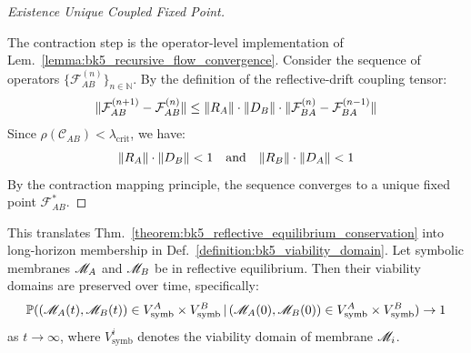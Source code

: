 \begin{proof}[Existence Unique Coupled Fixed Point]
\label{proof:bk5_existence_unique_coupled_fixed_point}
\leavevmode

The contraction step is the operator-level implementation of Lem.~\ref{lemma:bk5_recursive_flow_convergence}.
Consider the sequence of operators $\{\mathcal{F}_{AB}^{(n)}\}_{n \in \mathbb{N}}$. By the definition of the reflective-drift coupling tensor:
\begin{equation}
\|\mathcal{F}_{AB}^{(n+1)} - \mathcal{F}_{AB}^{(n)}\| \leq \|R_A\| \cdot \|D_B\| \cdot \|\mathcal{F}_{BA}^{(n)} - \mathcal{F}_{BA}^{(n-1)}\|
\end{equation}
Since $\rho(\mathcal{C}_{AB}) < \lambda_{\text{crit}}$, we have:
\begin{equation}
\|R_A\| \cdot \|D_B\| < 1 \quad \text{and} \quad \|R_B\| \cdot \|D_A\| < 1
\end{equation}
By the contraction mapping principle, the sequence converges to a unique fixed point $\mathcal{F}_{AB}^*$.
\end{proof}
\begin{proposition}
\label{proposition:bk5_viability_domain_preservation}
This translates Thm.~\ref{theorem:bk5_reflective_equilibrium_conservation} into long-horizon membership in Def.~\ref{definition:bk5_viability_domain}.
Let symbolic membranes $\mathscr{M}_A$ and $\mathscr{M}_B$ be in reflective equilibrium. Then their viability domains are preserved over time, specifically:
\begin{equation}
\mathbb{P}((\mathscr{M}_A(t), \mathscr{M}_B(t)) \in V_{\text{symb}}^A \times V_{\text{symb}}^B \,|\, (\mathscr{M}_A(0), \mathscr{M}_B(0)) \in V_{\text{symb}}^A \times V_{\text{symb}}^B) \to 1
\end{equation}
as $t \to \infty$, where $V_{\text{symb}}^i$ denotes the viability domain of membrane $\mathscr{M}_i$.
\end{proposition}
